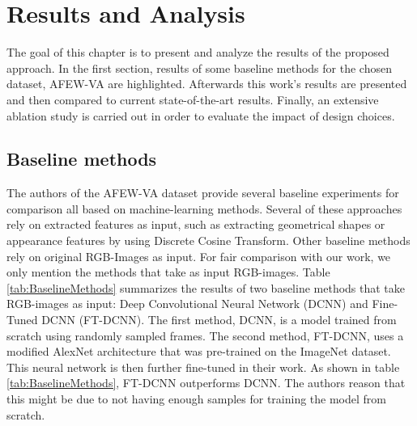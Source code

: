 \chapter{Results and Analysis}\label{chap:Analysis}
The goal of this chapter is to present and analyze the results of the proposed approach. In the first section, results of some baseline methods for the chosen dataset, AFEW-VA are highlighted. Afterwards this work's results are presented and then compared to current state-of-the-art results. Finally, an extensive ablation study is carried out in order to evaluate the impact of design choices.

\section{Baseline methods}
The authors of the AFEW-VA dataset \citep{Kossaifi:2017:AFEW-VADatabase} provide several baseline experiments for comparison all based on machine-learning methods. Several of these approaches rely on extracted features as input, such as extracting geometrical shapes or appearance features by using Discrete Cosine Transform. Other baseline methods rely on original RGB-Images as input. For fair comparison with our work, we only mention the methods that take as input RGB-images. 
\newline\newline
Table \ref{tab:BaselineMethods} summarizes the results of two baseline methods that take RGB-images as input: Deep Convolutional Neural Network (DCNN) and Fine-Tuned DCNN (FT-DCNN). The first method, DCNN, is a model trained from scratch using randomly sampled frames. The second method, FT-DCNN, uses a modified AlexNet architecture that was pre-trained on the ImageNet dataset. This neural network is then further fine-tuned in their work. As shown in table \ref{tab:BaselineMethods}, FT-DCNN outperforms DCNN. The authors reason that this might be due to not having enough samples for training the model from scratch.

